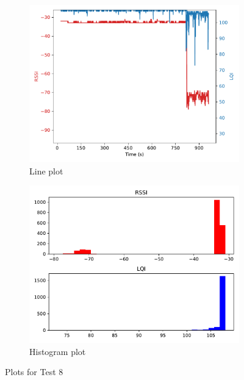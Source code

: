 \documentclass[runningheads]{llncs}
\begin{document}
\begin{figure}[ht]
    \centering
    \begin{subfigure}[b]{0.45\textwidth}
        \centering
        \includegraphics[width=\textwidth]{images/1-20-0-26-line.pdf}
        \caption{Line plot}
    \end{subfigure}
    \hfill
    \begin{subfigure}[b]{0.45\textwidth}
        \centering
        \includegraphics[width=\textwidth]{images/1-20-0-26-histogram.pdf}
        \caption{Histogram plot}
    \end{subfigure}
    \caption{Plots for Test 8}
\end{figure}
\end{document}
